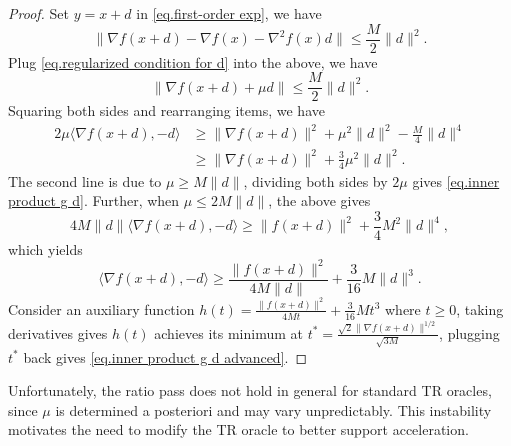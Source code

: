 \documentclass{mcom-l}
\numberwithin{equation}{section}
\begin{document}
\begin{proof}
    Set $y=x+d$ in \eqref{eq.first-order exp}, we have
    \begin{equation*}
        \|\nabla f(x+d)-\nabla f(x)-\nabla ^2 f(x) d\| \leq \frac{M}{2}\|d\|^2.
    \end{equation*}
    Plug \eqref{eq.regularized condition for d} into the above, we have
    \begin{equation*}
        \|\nabla f(x+d)+\mu d\| \leq \frac{M}{2}\|d\|^2.
    \end{equation*}
    Squaring both sides and rearranging items, we have
    \begin{equation*}
        \begin{aligned}
            2\mu \langle \nabla f(x+d),-d \rangle & \geq \|\nabla f(x+d)\|^2 +\mu^2 \|d\|^2 -\frac{M}{4}\|d\|^4 \\
                                                  & \geq \|\nabla f(x+d)\|^2 +\frac{3}{4}\mu^2 \|d\|^2.
        \end{aligned}
    \end{equation*}
    The second line is due to $\mu\geq M\|d\|$, dividing both sides by $2\mu$ gives \eqref{eq.inner product g d}. Further, when $\mu \leq 2M\|d\|$, the above gives
    \begin{equation*}
        4M\|d\| \langle \nabla f(x+d),-d \rangle \geq \|f(x+d)\|^2 +\frac{3}{4} M^2 \|d\|^4,
    \end{equation*}
    which yields
    \begin{equation*}
        \langle \nabla f(x+d),-d \rangle \geq \frac{\|f(x+d)\|^2}{4M\|d\|}+\frac{3}{16}M\|d\|^3.
    \end{equation*}
    Consider an auxiliary function $h(t) = \frac{\|f(x+d)\|^2}{4Mt}+\frac{3}{16}Mt^3$ where $t\geq 0$, taking derivatives gives $h(t)$ achieves its minimum at $t^*= \frac{\sqrt{2}\|\nabla f(x+d)\|^{1/2}}{\sqrt{3M}}$, plugging $t^*$ back gives \eqref{eq.inner product g d advanced}.
\end{proof}
Unfortunately, the ratio pass does not hold in general for standard TR oracles, since $\mu$ is determined a posteriori and may vary unpredictably. This instability motivates the need to modify the TR oracle to better support acceleration.
\end{document}
